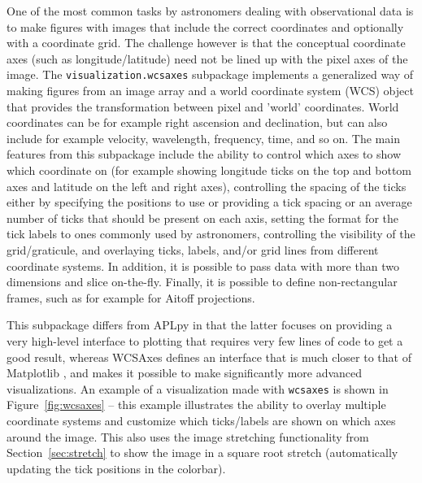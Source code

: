 \documentclass[modern]{aastex61}
\newcommand{\package}[1]{\texttt{#1}\xspace}
\begin{document}
One of the most common tasks by astronomers dealing with observational data is to make figures with images that include the correct coordinates and optionally with a coordinate grid. The challenge however is that the conceptual coordinate axes (such as longitude/latitude) need not be lined up with the pixel axes of the image. The \package{visualization.wcsaxes} subpackage implements a generalized way of making figures from an image array and a world coordinate system (WCS) object that provides the transformation between pixel and 'world' coordinates. World coordinates can be for example right ascension and declination, but can also include for example velocity, wavelength, frequency, time, and so on. The main features from this subpackage include the ability to control which axes to show which coordinate on (for example showing longitude ticks on the top and bottom axes and latitude on the left and right axes), controlling the spacing of the ticks either by specifying the positions to use or providing a tick spacing or an average number of ticks that should be present on each axis, setting the format for the tick labels to ones commonly used by astronomers, controlling the visibility of the grid/graticule, and overlaying ticks, labels, and/or grid lines from different coordinate systems. In addition, it is possible to pass data with more than two dimensions and slice on-the-fly. Finally, it is possible to define non-rectangular frames, such as for example for Aitoff projections.

This subpackage differs from APLpy \citep{aplpy} in that the latter focuses on providing a very high-level interface to plotting that requires very few lines of code to get a good result, whereas WCSAxes defines an interface that is much closer to that of Matplotlib \citep{matplotlib}, and makes it possible to make significantly more advanced visualizations. An example of a visualization made with \package{wcsaxes} is shown in Figure~\ref{fig:wcsaxes} -- this example illustrates the ability to overlay multiple coordinate systems and customize which ticks/labels are shown on which axes around the image. This also uses the image stretching functionality from Section~\ref{sec:stretch} to show the image in a square root stretch (automatically updating the tick positions in the colorbar).
\end{document}

